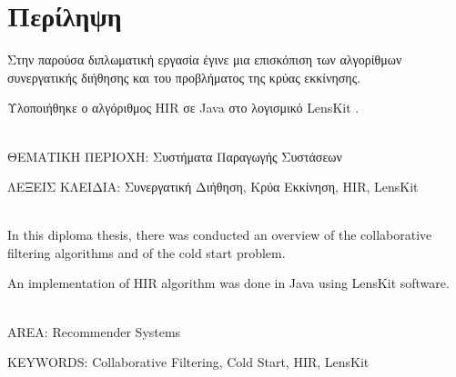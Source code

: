 \chapter*{Περίληψη}

Στην παρούσα διπλωματική εργασία έγινε μια επισκόπιση των αλγορίθμων συνεργατικής διήθησης και του προβλήματος της κρύας εκκίνησης. \par
Υλοποιήθηκε ο αλγόριθμος {\en HIR} \cite{Nikolakopoulos2015126} σε {\en Java} στο λογισμικό {\en LensKit} \cite{Ekstrand:2011:RRR:2043932.2043958}. \\ \\ 

\par ΘΕΜΑΤΙΚΗ ΠΕΡΙΟΧΗ: Συστήματα Παραγωγής Συστάσεων
\par ΛΕΞΕΙΣ ΚΛΕΙΔΙΑ: Συνεργατική Διήθηση, Κρύα Εκκίνηση, {\en HIR, LensKit} \\ \\

{\en In this diploma thesis, there was conducted an overview of the collaborative filtering algorithms and of the cold start problem. \par
An implementation of HIR algorithm \cite{Nikolakopoulos2015126} was done in Java using LensKit \cite{Ekstrand:2011:RRR:2043932.2043958} software.  \\ \\ 

\par AREA: Recommender Systems 
\par KEYWORDS: Collaborative Filtering, Cold Start, HIR, LensKit}
